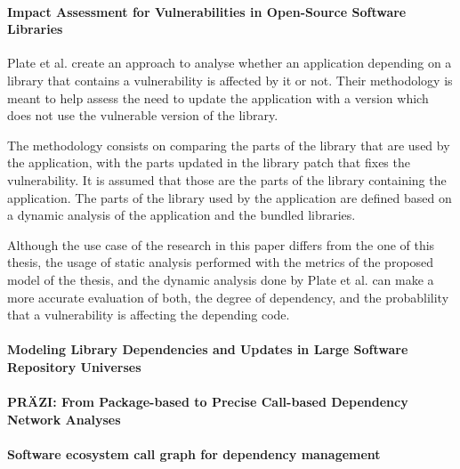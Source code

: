 \paragraph{Impact Assessment for Vulnerabilities in Open-Source Software Libraries \cite{plate2015impact}}
Plate et al. create an approach to analyse whether an application depending on a library that contains a vulnerability is affected by it or not. Their methodology is meant to help assess the need to update the application with a version which does not use the vulnerable version of the library.

The methodology consists on comparing the parts of the library that are used by the application, with the parts updated in the library patch that fixes the vulnerability. It is assumed that those are the parts of the library containing the application. The parts of the library used by the application are defined based on a dynamic analysis of the application and the bundled libraries.

Although the use case of the research in this paper differs from the one of this thesis, the usage of static analysis performed with the metrics of the proposed model of the thesis, and the dynamic analysis done by Plate et al. can make a more accurate evaluation of both, the degree of dependency, and the probablility that a vulnerability is affecting the depending code.

\paragraph{Modeling Library Dependencies and Updates in Large Software Repository Universes \cite{Kula2017}}

\paragraph{PRÄZI: From Package-based to Precise Call-based Dependency Network Analyses \cite{hejderup2018prazi}}

\paragraph{Software ecosystem call graph for dependency management \cite{hejderup2018software}}

